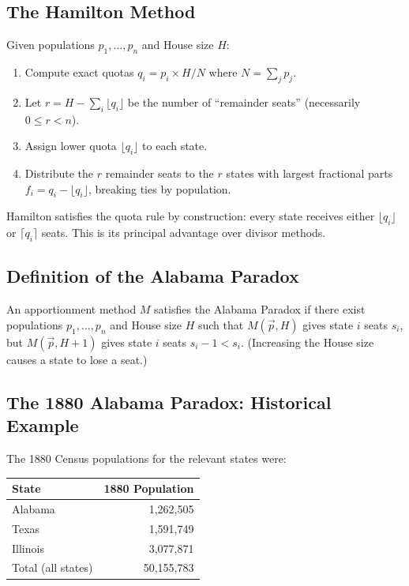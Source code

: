 \label{sec:alabama}

\subsection{The Hamilton Method}

\begin{definition}
  Given populations $p_1, \ldots, p_n$ and House size $H$:
  \begin{enumerate}
    \item Compute exact quotas $q_i = p_i \times H / N$ where $N = \sum_j p_j$.
    \item Let $r = H - \sum_i \lfloor q_i \rfloor$ be the number of
      ``remainder seats'' (necessarily $0 \leq r < n$).
    \item Assign lower quota $\lfloor q_i \rfloor$ to each state.
    \item Distribute the $r$ remainder seats to the $r$ states with
      largest fractional parts $f_i = q_i - \lfloor q_i \rfloor$,
      breaking ties by population.
  \end{enumerate}
\end{definition}

Hamilton satisfies the quota rule by construction:
every state receives either $\lfloor q_i \rfloor$ or $\lceil q_i \rceil$
seats.
This is its principal advantage over divisor methods.

\subsection{Definition of the Alabama Paradox}

\begin{definition}
  An apportionment method $M$ satisfies the Alabama Paradox if there
  exist populations $p_1, \ldots, p_n$ and House size $H$ such that
  $M(\vec{p}, H)$ gives state $i$ seats $s_i$, but
  $M(\vec{p}, H+1)$ gives state $i$ seats $s_i - 1 < s_i$.
  (Increasing the House size causes a state to lose a seat.)
\end{definition}

\subsection{The 1880 Alabama Paradox: Historical Example}

The 1880 Census populations for the relevant states were:
\begin{center}
\begin{tabular}{lr}
\toprule
State & 1880 Population \\
\midrule
Alabama       & 1,262,505 \\
Texas         & 1,591,749 \\
Illinois      & 3,077,871 \\
Total (all states) & 50,155,783 \\
\bottomrule
\end{tabular}
\end{center}

